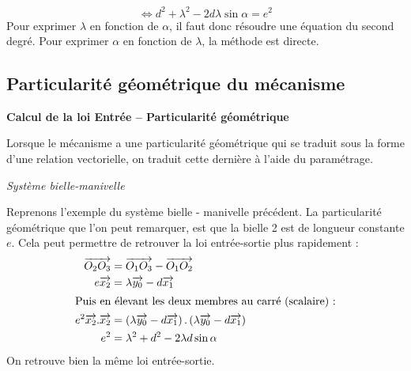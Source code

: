 \documentclass[10pt,oneside]{article}
\begin{document}
\begin{exemple}
$$
\Longleftrightarrow
d^2+ \lambda^2 - 2d\lambda\sin\alpha = e^2
$$
Pour exprimer $\lambda$ en fonction de $\alpha$, il faut donc résoudre une équation du second degré. Pour exprimer $\alpha$ en fonction de $\lambda$, la méthode est directe. 


\end{exemple}



\subsection{Particularité géométrique du mécanisme}


\begin{methode}
\textbf{Calcul de la loi Entrée -- Particularité géométrique}

Lorsque le mécanisme a une particularité géométrique qui se traduit sous la forme d'une relation vectorielle, on traduit cette dernière à l'aide du paramétrage.

\end{methode}

\begin{exemple}
\textit{Système bielle-manivelle}

Reprenons l'exemple du système bielle - manivelle précédent. La particularité géométrique que l'on peut remarquer, est que la bielle 2 est de longueur constante $e$. Cela peut permettre de retrouver la loi entrée-sortie plus rapidement :
\begin{align*}
\overrightarrow{O_2 O_3}&=\overrightarrow{O_1 O_3}-\overrightarrow{O_1 O_2}\\
e \overrightarrow{x_2}&= \lambda \overrightarrow{y_0}-d\overrightarrow{x_1}\\
\intertext{Puis en élevant les deux membres au carré (scalaire) :}
e^2 \overrightarrow{x_2}.\overrightarrow{x_2}&= \left(\lambda \overrightarrow{y_0}-d\overrightarrow{x_1}\right).\left( \lambda \overrightarrow{y_0}-d\overrightarrow{x_1}\right)\\
e^2&=\lambda^2 + d^2 - 2\lambda d \sin \alpha
\end{align*}
On retrouve bien la même loi entrée-sortie.
\end{exemple}
\end{document}
